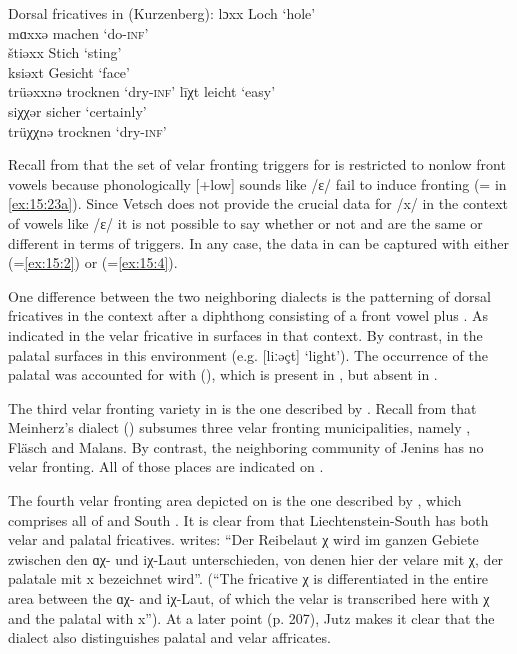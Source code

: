 \ea%
\label{ex:15:45}Dorsal fricatives in  (Kurzenberg):
\ea\label{ex:15:45a}  lɔxx \tab [lɔxx] \tab Loch \tab ‘hole’ \\
     mɑxxə \tab [mɑxxə] \tab machen \tab ‘do-\textsc{inf}’ \\
\ex\label{ex:15:45b}  štiəxx \tab [ʃtiəxx] \tab Stich \tab ‘sting’ \\
     ksiəxt \tab [ksiəxt] \tab Gesicht \tab ‘face’ \\
     trüəxxnə \tab [tryəxxnə] \tab trocknen \tab ‘dry-\textsc{inf}’ 
\ex\label{ex:15:45c}  līχt \tab  [liːçt] \tab leicht \tab ‘easy’ \\
     siχχər \tab [siçər] \tab sicher \tab ‘certainly’ \\
     trüχχnə \tab [tryççnə] \tab trocknen \tab ‘dry-\textsc{inf}’ 
\z 
\z 


Recall from  that the set of velar fronting triggers for  is restricted to nonlow front vowels because phonologically [+low] sounds like /ɛ/ fail to induce fronting (= in \ref{ex:15:23a}). Since Vetsch does not provide the crucial data for /x/ in the context of vowels like /ɛ/ it is not possible to say whether or not  and  are the same or different in terms of triggers. In any case, the data in  can be captured with either  (=\ref{ex:15:2}) or  (=\ref{ex:15:4}).

One difference between the two neighboring dialects is the patterning of dorsal fricatives in the context after a diphthong consisting of a front vowel plus . As indicated in  the velar fricative in  surfaces in that context. By contrast, in  the palatal surfaces in this environment (e.g. [liːəçt] ‘light’). The occurrence of the palatal was accounted for with  (), which is present in , but absent in .

The third velar fronting variety in  is the one described by \citet{Meinherz1920}. Recall from  that Meinherz’s dialect () subsumes three velar fronting municipalities, namely , Fläsch and Malans. By contrast, the neighboring community of Jenins has no velar fronting. All of those places are indicated on .

The fourth velar fronting area depicted on  is the one described by \citet{Jutz1925}, which comprises all of  and South . It is clear from \citet{Jutz1925} that Liechtenstein-South  has both velar and palatal fricatives. \citet[26]{Jutz1925} writes: “Der Reibelaut χ wird im ganzen Gebiete zwischen den ɑχ- und iχ-Laut  unterschieden, von denen hier der velare mit χ, der palatale mit x bezeichnet wird”. (“The fricative χ is differentiated in the entire area between the ɑχ- and iχ-Laut, of which the velar is transcribed here with χ and the palatal with x”). At a later point (p. 207), Jutz makes it clear that the dialect also distinguishes palatal and velar affricates.

